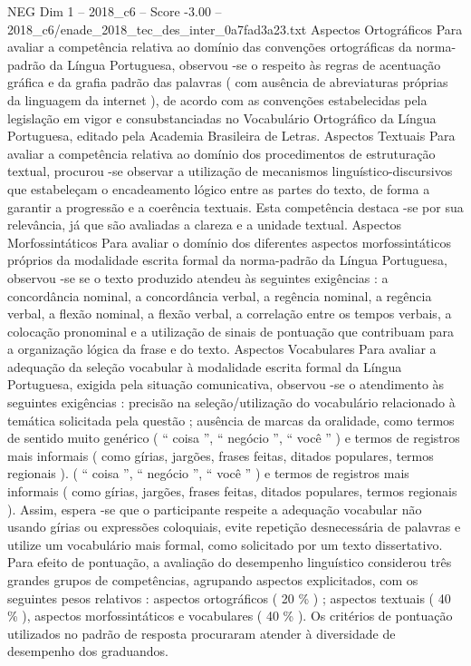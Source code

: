 \begin{textsample}{NEG Dim 1 – 2018\_c6 – Score -3.00 – 2018\_c6/enade\_2018\_tec\_des\_inter\_0a7fad3a23.txt}
Aspectos Ortográficos Para avaliar a competência relativa ao domínio das convenções ortográficas da norma-padrão da Língua Portuguesa, observou -se o respeito às regras de acentuação gráfica e da grafia padrão das palavras ( com ausência de abreviaturas próprias da linguagem da internet ), de acordo com as convenções estabelecidas pela legislação em vigor e consubstanciadas no Vocabulário Ortográfico da Língua Portuguesa, editado pela Academia Brasileira de Letras.
Aspectos Textuais Para avaliar a competência relativa ao domínio dos procedimentos de estruturação textual, procurou -se observar a utilização de mecanismos linguístico-discursivos que estabeleçam o encadeamento lógico entre as partes do texto, de forma a garantir a progressão e a coerência textuais.
Esta competência destaca -se por sua relevância, já que são avaliadas a clareza e a unidade textual.
Aspectos Morfossintáticos Para avaliar o domínio dos diferentes aspectos morfossintáticos próprios da modalidade escrita formal da norma-padrão da Língua Portuguesa, observou -se se o texto produzido atendeu às seguintes exigências : a concordância nominal, a concordância verbal, a regência nominal, a regência verbal, a flexão nominal, a flexão verbal, a correlação entre os tempos verbais, a colocação pronominal e a utilização de sinais de pontuação que contribuam para a organização lógica da frase e do texto.
Aspectos Vocabulares Para avaliar a adequação da seleção vocabular à modalidade escrita formal da Língua Portuguesa, exigida pela situação comunicativa, observou -se o atendimento às seguintes exigências : precisão na seleção/utilização do vocabulário relacionado à temática solicitada pela questão ; ausência de marcas da oralidade, como termos de sentido muito genérico ( “ coisa ”, “ negócio ”, “ você ” ) e termos de registros mais informais ( como gírias, jargões, frases feitas, ditados populares, termos regionais ). ( “ coisa ”, “ negócio ”, “ você ” ) e termos de registros mais informais ( como gírias, jargões, frases feitas, ditados populares, termos regionais ).
Assim, espera -se que o participante respeite a adequação vocabular não usando gírias ou expressões coloquiais, evite repetição desnecessária de palavras e utilize um vocabulário mais formal, como solicitado por um texto dissertativo.
Para efeito de pontuação, a avaliação do desempenho linguístico considerou três grandes grupos de competências, agrupando aspectos explicitados, com os seguintes pesos relativos : aspectos ortográficos ( 20 \% ) ; aspectos textuais ( 40 \% ), aspectos morfossintáticos e vocabulares ( 40 \% ).
Os critérios de pontuação utilizados no padrão de resposta procuraram atender à diversidade de desempenho dos graduandos.

\end{textsample}
